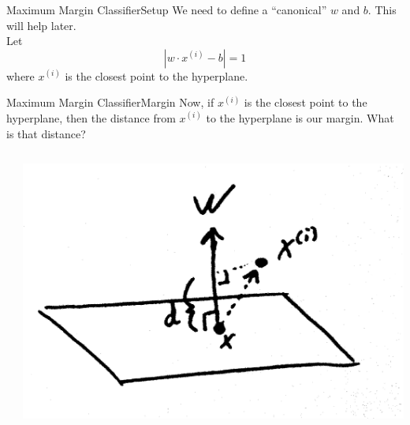 \documentclass[xcolor=dvipsnames]{beamer}
\begin{document}
\begin{frame}{Maximum Margin Classifier}{Setup}
    We need to define a ``canonical'' $w$ and $b$. This will help later.\\
    \vspace{1em}
    Let
    $$| w \cdotp x^{(i)} - b | = 1$$
    where $x^{(i)}$ is the closest point to the hyperplane.\\
    \vspace{2em}
\end{frame}

\begin{frame}{Maximum Margin Classifier}{Margin}
    Now, if $x^{(i)}$ is the closest point to the hyperplane, then the distance from $x^{(i)}$ to the hyperplane is our margin. What is that distance?
    \vspace{1em}
    \begin{columns}
        \begin{column}{0.5\textwidth}
        \end{column}
        \begin{column}{0.5\textwidth}
            \includegraphics[width=\textwidth]{figs/distance_projection.png}
        \end{column}
    \end{columns}
\end{frame}
\end{document}
